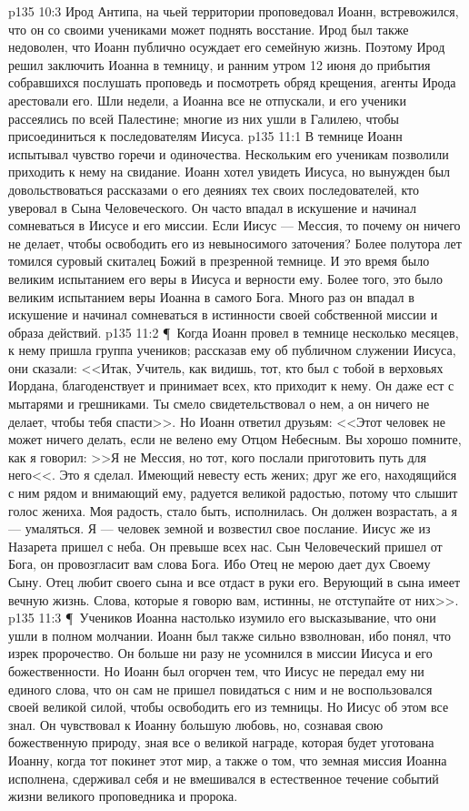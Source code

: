 \vs p135 10:3 Ирод Антипа, на чьей территории проповедовал Иоанн, встревожился, что он со своими учениками может поднять восстание. Ирод был также недоволен, что Иоанн публично осуждает его семейную жизнь. Поэтому Ирод решил заключить Иоанна в темницу, и ранним утром 12 июня до прибытия собравшихся послушать проповедь и посмотреть обряд крещения, агенты Ирода арестовали его. Шли недели, а Иоанна все не отпускали, и его ученики рассеялись по всей Палестине; многие из них ушли в Галилею, чтобы присоединиться к последователям Иисуса.
\vs p135 11:1 В темнице Иоанн испытывал чувство горечи и одиночества. Нескольким его ученикам позволили приходить к нему на свидание. Иоанн хотел увидеть Иисуса, но вынужден был довольствоваться рассказами о его деяниях тех своих последователей, кто уверовал в Сына Человеческого. Он часто впадал в искушение и начинал сомневаться в Иисусе и его миссии. Если Иисус --- Мессия, то почему он ничего не делает, чтобы освободить его из невыносимого заточения? Более полутора лет томился суровый скиталец Божий в презренной темнице. И это время было великим испытанием его веры в Иисуса и верности ему. Более того, это было великим испытанием веры Иоанна в самого Бога. Много раз он впадал в искушение и начинал сомневаться в истинности своей собственной миссии и образа действий.
\vs p135 11:2 \P\ Когда Иоанн провел в темнице несколько месяцев, к нему пришла группа учеников; рассказав ему об публичном служении Иисуса, они сказали: <<Итак, Учитель, как видишь, тот, кто был с тобой в верховьях Иордана, благоденствует и принимает всех, кто приходит к нему. Он даже ест с мытарями и грешниками. Ты смело свидетельствовал о нем, а он ничего не делает, чтобы тебя спасти>>. Но Иоанн ответил друзьям: <<Этот человек не может ничего делать, если не велено ему Отцом Небесным. Вы хорошо помните, как я говорил: >>Я не Мессия, но тот, кого послали приготовить путь для него<<. Это я сделал. Имеющий невесту есть жених; друг же его, находящийся с ним рядом и внимающий ему, радуется великой радостью, потому что слышит голос жениха. Моя радость, стало быть, исполнилась. Он должен возрастать, а я --- умаляться. Я --- человек земной и возвестил свое послание. Иисус же из Назарета пришел с неба. Он превыше всех нас. Сын Человеческий пришел от Бога, он провозгласит вам слова Бога. Ибо Отец не мерою дает дух Своему Сыну. Отец любит своего сына и все отдаст в руки его. Верующий в сына имеет вечную жизнь. Слова, которые я говорю вам, истинны, не отступайте от них>>.
\vs p135 11:3 \P\ Учеников Иоанна настолько изумило его высказывание, что они ушли в полном молчании. Иоанн был также сильно взволнован, ибо понял, что изрек пророчество. Он больше ни разу не усомнился в миссии Иисуса и его божественности. Но Иоанн был огорчен тем, что Иисус не передал ему ни единого слова, что он сам не пришел повидаться с ним и не воспользовался своей великой силой, чтобы освободить его из темницы. Но Иисус об этом все знал. Он чувствовал к Иоанну большую любовь, но, сознавая свою божественную природу, зная все о великой награде, которая будет уготована Иоанну, когда тот покинет этот мир, а также о том, что земная миссия Иоанна исполнена, сдерживал себя и не вмешивался в естественное течение событий жизни великого проповедника и пророка.
